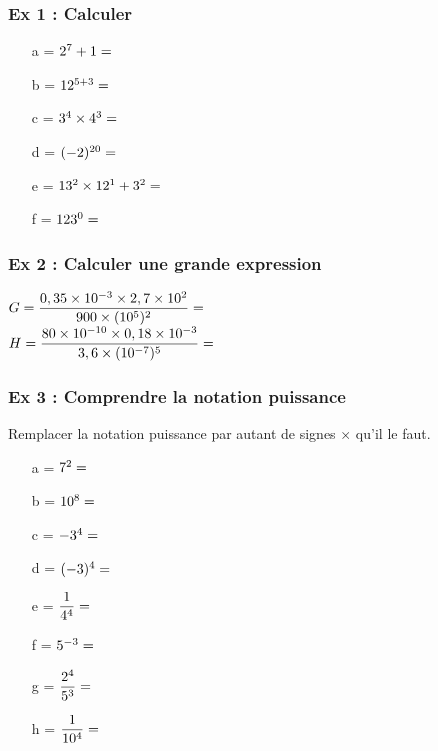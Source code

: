 \documentclass[10pt]{article}
\begin{document}
\subsubsection*{Ex 1 : Calculer}

\begin{multicols}{3}
  \begin{itemize}
  \item[a =] $2^7 + 1 =  \dotfill $
  \item[b =] $12^{5+3} =  \dotfill $
  \item[c =] $3^4 \times 4^3 =  \dotfill $
  \item[d =] $(-2)^{20} =  \dotfill $
  \item[e =] $13^2 \times 12^1 + 3^2 =  \dotfill $
  \item[f =] $123^0 =  \dotfill $
  \end{itemize}

\end{multicols}

\subsubsection*{Ex 2 : Calculer une grande expression }


\begin{multicols}{2}

  $G = \dfrac{0,35 \times 10^{-3} \times 2,7 \times 10^{2}}{900 \times (10^5)^2} =  \dotfill $\\
  $H = \dfrac{80 \times 10^{-10} \times 0,18 \times 10^{-3}}{3,6 \times (10^{-7})^5} =  \dotfill $ 
\end{multicols}


\subsubsection*{Ex 3 : Comprendre la notation puissance}

Remplacer la notation puissance par autant de signes $\times$ qu'il le faut. 

\begin{multicols}{3}
  \begin{itemize}
  \item[a =] $7^2 =  \dotfill $
  \item[b =] $10^{8} =  \dotfill $
  \item[c =] $-3^4  =  \dotfill $
  \item[d =] $(-3)^{4} =  \dotfill $
  \item[e =] $\dfrac{1}{4^4} =  \dotfill $
  \item[f =] $ 5^{-3} =  \dotfill $
  \item[g =] $ \dfrac{2^4}{5^{3}} =  \dotfill $
  \item[h =] $ \dfrac{1}{10^{4}} =  \dotfill $
  \end{itemize}
\end{multicols}
\end{document}
